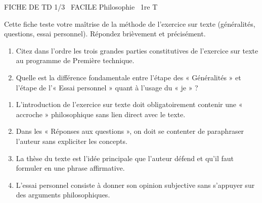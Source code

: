 \documentclass[11pt]{article}
\begin{document}
\begin{tcolorbox}[enhanced,colback=popink,colframe=popink,arc=10pt,boxrule=0pt,left=12pt,right=12pt,top=9pt,bottom=9pt]
{\color{white}\popxbold\small FICHE DE TD 1/3 \textbullet\ FACILE \hfill Philosophie \textbullet\ 1re T\par}
\end{tcolorbox}
\vspace{4pt}
\noindent Cette fiche teste votre maîtrise de la méthode de l'exercice sur texte (généralités, questions, essai personnel). Répondez brièvement et précisément.

\begin{exercice}
\begin{enumerate}
    \item Citez dans l'ordre les trois grandes parties constitutives de l'exercice sur texte au programme de Première technique.
    \item Quelle est la différence fondamentale entre l'étape des « Généralités » et l'étape de l'« Essai personnel » quant à l'usage du « je » ?
\end{enumerate}
\end{exercice}

\begin{exercice}
\begin{enumerate}
    \item L'introduction de l'exercice sur texte doit obligatoirement contenir une « accroche » philosophique sans lien direct avec le texte.
    \item Dans les « Réponses aux questions », on doit se contenter de paraphraser l'auteur sans expliciter les concepts.
    \item La thèse du texte est l'idée principale que l'auteur défend et qu'il faut formuler en une phrase affirmative.
    \item L'essai personnel consiste à donner son opinion subjective sans s'appuyer sur des arguments philosophiques.
\end{enumerate}
\end{exercice}
\end{document}
